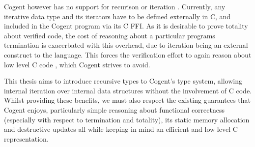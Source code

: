 Cogent however has no support for recurison or iteration . 
Currently, any iterative data type and its iterators have to be defined externally in C,
  and included in the Cogent program via its C FFI.
As it is desirable to prove totality about verified code,
  the cost of reasoning about a particular programs termination is exacerbated with this overhead,
  due to iteration being an external construct to the language.
This forces the verification effort to again reason about low level C code , which Cogent strives to avoid.

This thesis aims to introduce recursive types to Cogent's type system, allowing internal iteration over
  internal data structures without the involvement of C code.
Whilst providing these benefits, we must also respect the existing guarantees that Cogent enjoys,
  particularly simple reasoning about functional correctness (especially with respect to termination and totality),
  its static memory allocation and destructive updates all while keeping in mind
  an efficient and low level C representation.

